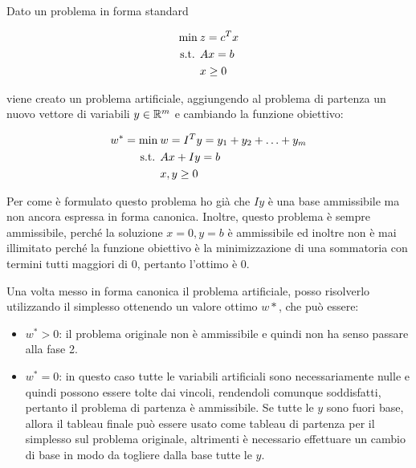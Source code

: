 Dato un problema in forma standard

\begin{align*}
\min \:& z=c^Tx \\
\text{s.t. }& Ax=b \\
&x\geq 0
\end{align*}

\noindent viene creato un problema artificiale, aggiungendo al problema di partenza un nuovo vettore di variabili $y \in \mathbb{R}^{m}$ e cambiando la funzione obiettivo:

\begin{align*}
w^* = \min \:& w= I^Ty = y_1 + y_2 + \ldots + y_m \\
\text{s.t. }& Ax + Iy=b \\
&x, y\geq 0
\end{align*}

Per come è formulato questo problema ho già che $Iy$ è una base ammissibile ma non ancora espressa in forma canonica.
Inoltre, questo problema è sempre ammissibile, perché la soluzione $x = 0, y=b$ è ammissibile ed inoltre non è mai illimitato perché la funzione obiettivo è la minimizzazione di una sommatoria con termini tutti maggiori di 0, pertanto l'ottimo è 0.

Una volta messo in forma canonica il problema artificiale, posso risolverlo utilizzando il simplesso ottenendo un valore ottimo $w*$, che può essere:

\begin{itemize}
\item $w^* > 0$: il problema originale non è ammissibile e quindi non ha senso passare alla fase 2.
\item $w^* = 0$: in questo caso tutte le variabili artificiali sono necessariamente nulle e quindi possono essere tolte dai vincoli, rendendoli comunque soddisfatti, pertanto il problema di partenza è ammissibile. Se tutte le $y$ sono fuori base, allora il tableau finale può essere usato come tableau di partenza per il simplesso sul problema originale, altrimenti è necessario effettuare un cambio di base in modo da togliere dalla base tutte le $y$.


\end{itemize}
















